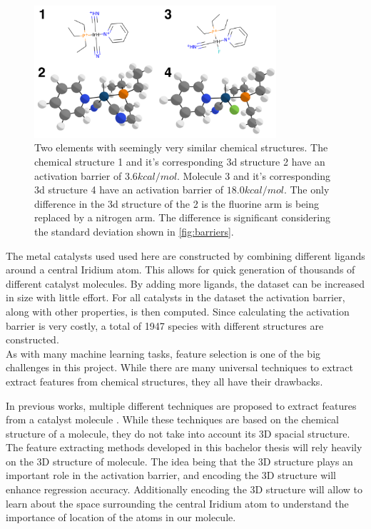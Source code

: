 \begin{figure}
  \centering
  \includegraphics[width=0.8\textwidth]{figures/introduction/elems_intro.png}
  \caption{Two elements with seemingly very similar chemical structures. The chemical structure 1 and it's corresponding 3d structure 2 have an activation barrier of $3.6 kcal/mol$.
  Molecule 3 and it's corresponding 3d structure 4 have an activation barrier of $18.0 kcal/mol$.
  The only difference in the 3d structure of the 2 is the fluorine arm is being replaced by a nitrogen arm.
  The difference is significant considering the standard deviation shown in \ref{fig:barriers}.  }
  \label{fig:struct-diff}
\end{figure}


The metal catalysts used used here are constructed by combining different ligands around a central Iridium atom.
This allows for quick generation of thousands of different catalyst molecules.
By adding more ligands, the dataset can be increased in size with little effort.
For all catalysts in the dataset the activation barrier, along with other properties, is then computed.
Since calculating the activation barrier is very costly, a total of 1947 species with different structures are constructed.
\\
As with many machine learning tasks, feature selection is one of the big challenges in this project.
While there are many universal techniques to extract extract features from chemical structures, they all have their drawbacks.

In previous works, multiple different techniques are proposed to extract features from a catalyst molecule \cite{friederich_dos}.
While these techniques are based on the chemical structure of a molecule, they do not take into account its 3D spacial structure.
The feature extracting methods developed in this bachelor thesis will rely heavily on the 3D structure of molecule.
The idea being that the 3D structure plays an important role in the activation barrier, and encoding the 3D structure will enhance regression accuracy.
Additionally encoding the 3D structure will allow to learn about the space surrounding the central 
Iridium atom to understand the importance of location of the atoms in our molecule.

